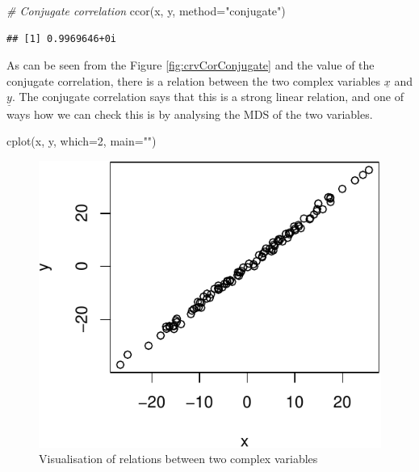 \documentclass[
]{book}
\newenvironment{Shaded}{\begin{snugshade}}{\end{snugshade}}
\newcommand{\AttributeTok}[1]{\textcolor[rgb]{0.77,0.63,0.00}{#1}}
\newcommand{\CommentTok}[1]{\textcolor[rgb]{0.56,0.35,0.01}{\textit{#1}}}
\newcommand{\DecValTok}[1]{\textcolor[rgb]{0.00,0.00,0.81}{#1}}
\newcommand{\FunctionTok}[1]{\textcolor[rgb]{0.00,0.00,0.00}{#1}}
\newcommand{\NormalTok}[1]{#1}
\newcommand{\StringTok}[1]{\textcolor[rgb]{0.31,0.60,0.02}{#1}}
\begin{document}
\begin{Shaded}
\begin{Highlighting}[]
\CommentTok{\# Conjugate correlation}
\FunctionTok{ccor}\NormalTok{(x, y, }\AttributeTok{method=}\StringTok{"conjugate"}\NormalTok{)}
\end{Highlighting}
\end{Shaded}

\begin{verbatim}
## [1] 0.9969646+0i
\end{verbatim}

As can be seen from the Figure \ref{fig:crvCorConjugate} and the value of the conjugate correlation, there is a relation between the two complex variables \(\underline{x}\) and \(\underline{y}\). The conjugate correlation says that this is a strong linear relation, and one of ways how we can check this is by analysing the MDS of the two variables.

\begin{Shaded}
\begin{Highlighting}[]
\FunctionTok{cplot}\NormalTok{(x, y, }\AttributeTok{which=}\DecValTok{2}\NormalTok{, }\AttributeTok{main=}\StringTok{""}\NormalTok{)}
\end{Highlighting}
\end{Shaded}

\begin{figure}
\centering
\includegraphics{Svetunkov---Svetunkov---Complex-Dynamic-Models_files/figure-latex/crvCorConjugateMDS-1.pdf}
\caption{\label{fig:crvCorConjugateMDS}Visualisation of relations between two complex variables}
\end{figure}
\end{document}
